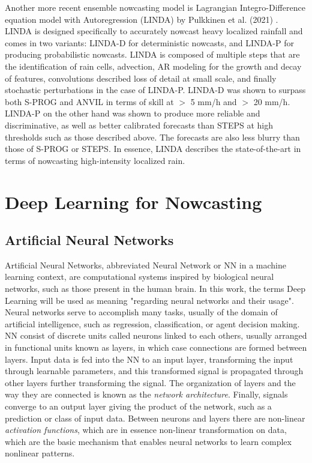Another more recent ensemble nowcasting model is Lagrangian Integro-Difference equation model with Autoregression (LINDA) by Pulkkinen et al. (2021) \cite{pulkkinen_lagrangian_2021}. LINDA is designed specifically to accurately nowcast heavy localized rainfall and comes in two variants: LINDA-D for deterministic nowcasts, and LINDA-P for producing probabilistic nowcasts. LINDA is composed of multiple steps that are the identification of rain cells, advection, AR modeling for the growth and decay of features, convolutions described loss of detail at small scale, and finally stochastic perturbations in the case of LINDA-P. LINDA-D was shown to surpass both S-PROG and ANVIL in terms of skill at  $>$ 5 mm/h and $>$ 20 mm/h. LINDA-P on the other hand was shown to produce more reliable and discriminative, as well as better calibrated forecasts than STEPS at high thresholds such as those described above. The forecasts are also less blurry than those of S-PROG or STEPS. In essence, LINDA describes the state-of-the-art in terms of nowcasting high-intensity localized rain. 







\section{Deep Learning for Nowcasting}

\subsection{Artificial Neural Networks}

Artificial Neural Networks, abbreviated Neural Network or NN in a machine learning context, are computational systems inspired by biological neural networks, such as those present in the human brain. In this work, the terms Deep Learning will be used as meaning "regarding neural networks and their usage". Neural networks serve to accomplish many tasks, usually of the domain of artificial intelligence, such as regression, classification, or agent decision making. NN consist of discrete units called neurons linked to each others, usually arranged in functional units known as layers, in which case connections are formed between layers. Input data is fed into the NN to an input layer, transforming the input through learnable parameters, and this transformed signal is propagated through other layers further transforming the signal. The organization of layers and the way they are connected is known as the \textit{network architecture}. Finally, signals converge to an output layer giving the product of the network, such as a prediction or class of input data. Between neurons and layers there are non-linear \textit{activation functions}, which are in essence non-linear transformation on data, which are the basic mechanism that enables neural networks to learn complex nonlinear patterns.

